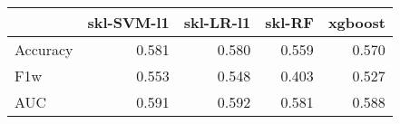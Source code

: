 \begin{tabular}{lrrrr}
\toprule
{} &  skl-SVM-l1 &  skl-LR-l1 &  skl-RF &  xgboost \\
\midrule
Accuracy &       0.581 &      0.580 &   0.559 &    0.570 \\
F1w      &       0.553 &      0.548 &   0.403 &    0.527 \\
AUC      &       0.591 &      0.592 &   0.581 &    0.588 \\
\bottomrule
\end{tabular}
